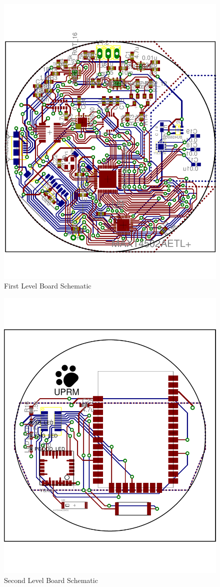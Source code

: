 \begin{figure}[H]
\centering
	\includegraphics[width=\textwidth]{img/FirstLevelBoard}
	\caption{First Level Board Schematic \label{fig:firstBoard}}
\end{figure}

\begin{figure}[H]
\centering
	\includegraphics[width=\textwidth]{img/SecondLevelBoard}
	\caption{Second Level Board Schematic \label{fig:secondBoard}}
\end{figure}
